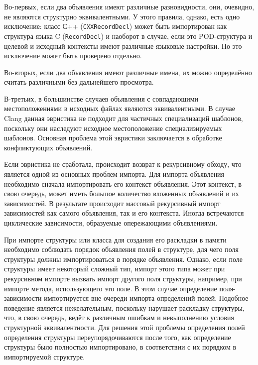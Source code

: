 Во-первых, если два объявления имеют различные разновидности, они, очевидно, не являются структурно эквивалентными. У этого правила, однако, есть одно исключение: класс С++ (\texttt{CXXRecordDecl}) может быть импортирован как структура языка C (\texttt{RecordDecl}) и наоборот в случае, если это POD-структура и целевой и исходный контексты имеют различные языковые настройки. Но это исключение может быть проверено отдельно.

Во-вторых, если два объявления имеют различные имена, их можно определённо считать различными без дальнейшего просмотра.

В-третьих, в большинстве случаев объявления с совпадающими местоположениями в исходных файлах являются эквивалентными. В случае Clang данная эвристика не подходит для частичных специализаций шаблонов, поскольку они наследуют исходное местоположение специализируемых шаблонов. Основная проблема этой эвристики заключается в обработке конфликтующих объявлений.

Если эвристика не сработала, происходит возврат к рекурсивному обходу, что является одной из основных проблем импорта. Для импорта объявления необходимо сначала импортировать его контекст объявления. Этот контекст, в свою очередь, может иметь большое количество вложенных объявлений и их зависимостей. В результате происходит массовый рекурсивный импорт зависимостей как самого объявления, так и его контекста. Иногда встречаются циклические зависимости, образуемые опережающими объявлениями.

При импорте структуры или класса для создания его раскладки в памяти необходимо соблюдать порядок объявления полей в структуре, для чего поля структуры должны импортироваться в порядке объявления. Однако, если поле структуры имеет некоторый сложный тип, импорт этого типа может при рекурсивном импорте вызвать импорт другого поля структуры, например, при импорте метода, использующего это поле. В этом случае определение поля-зависимости импортируется  вне очереди импорта определений полей. Подобное поведение является нежелательным, поскольку нарушает раскладку структуры, что, в свою очередь, ведёт к различным ошибкам и невыполнению условия структурной эквивалентности. Для решения этой проблемы определения полей определения структуры переупорядочиваются после того, как определение структуры было полностью импортировано, в соответствии с их порядком в импортируемой структуре.

